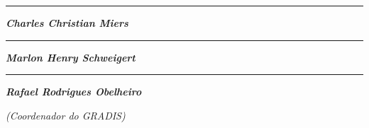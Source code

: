 \vskip 1.5cm

\begin{minipage} {0.49\linewidth}
  \centering
  \rule{7.2cm}{0.1mm}

  \textbf{\textit{Charles Christian Miers}}
\end{minipage}
\begin{minipage} {0.49\linewidth}
  \centering
  \rule{7.2cm}{0.1mm}

  \textbf{\textit{Marlon Henry Schweigert}}
\end{minipage}

\bigskip
\bigskip
\bigskip

\begin{minipage} {1\linewidth}
  \centering
  \rule{7.2cm}{0.1mm}

  \textbf{\textit{Rafael Rodrigues Obelheiro}}

  \textit{(Coordenador do GRADIS)}
\end{minipage}
